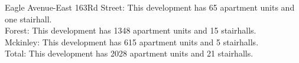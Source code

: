 {Eagle Avenue-East 163Rd Street}: This development has 65 apartment units and one stairhall.\\{Forest}: This development has 1348 apartment units and 15 stairhalls.\\{Mckinley}: This development has 615 apartment units and 5 stairhalls.\\{Total}: This development has 2028 apartment units and 21 stairhalls.\\